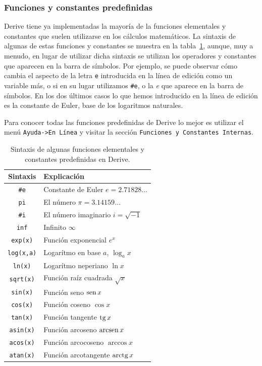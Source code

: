 \subsubsection*{Funciones y constantes predefinidas} Derive tiene ya
implementadas la mayoría de la funciones elementales y constantes
que suelen utilizarse en los cálculos matemáticos. La sintaxis de
algunas de estas funciones y constantes se muestra en la
tabla~\ref{t:funcioneselementales}, aunque, muy a menudo, en lugar
de utilizar dicha sintaxis se utilizan los operadores y constantes
que aparecen en la barra de símbolos. Por ejemplo, se puede
observar cómo cambia el aspecto de la letra \texttt{e} introducida
en la línea de edición como un variable más, o si en su lugar
utilizamos \verb"#"\texttt{e}, o la \emph{e} que aparece en la
barra de símbolos. En los dos últimos casos lo que hemos
introducido en la línea de edición es la constante de Euler, base
de los logaritmos naturales.

Para conocer todas las funciones predefinidas de Derive lo mejor es
utilizar el menú \texttt{Ayuda->En Línea} y visitar la sección
\texttt{Funciones y Constantes Internas}.
\begin{table}[h!]
  \centering
  \begin{tabular}{|c|l|}
\hline
 Sintaxis &            Explicación             \\
\hline\hline
    \verb"#"\texttt{e}     &     Constante de Euler $e=2.71828\ldots$     \\
\hline
    \texttt{pi}    &   El número $\pi=3.14159\ldots$    \\
\hline
    \verb"#"\texttt{i}     & El número imaginario $i=\sqrt{-1}$ \\
\hline
    \texttt{inf} & Infinito $\infty$\\
\hline
  \texttt{exp(x)}  &     Función exponencial $e^x$      \\
\hline
 \texttt{log(x,a)} & Logarítmo en base $a$, $\log_a x$  \\
\hline
  \texttt{ln(x)}   &    Logarítmo neperiano $\ln x$     \\
\hline
 \texttt{sqrt(x)}  &  Función raíz cuadrada $\sqrt{x}$  \\
\hline
  \texttt{sin(x)}  &       Función seno $\mathop{\rm sen}\nolimits x$        \\
\hline
  \texttt{cos(x)}  &      Función coseno $\cos x$       \\
\hline
  \texttt{tan(x)}  &      Función tangente $\mathop{\rm tg}\nolimits x$      \\
\hline
 \texttt{asin(x)}  &    Función arcoseno $\mathop{\rm arcsen}\nolimits x$    \\
\hline
 \texttt{acos(x)}  &   Función arcocoseno $\arccos x$   \\
\hline
 \texttt{atan(x)}  &  Función arcotangente $\mathop{\rm arctg}\nolimits x$   \\
\hline
\end{tabular}

  \caption{Sintaxis de algunas funciones elementales y constantes
  predefinidas en Derive.} \label{t:funcioneselementales}
\end{table}

